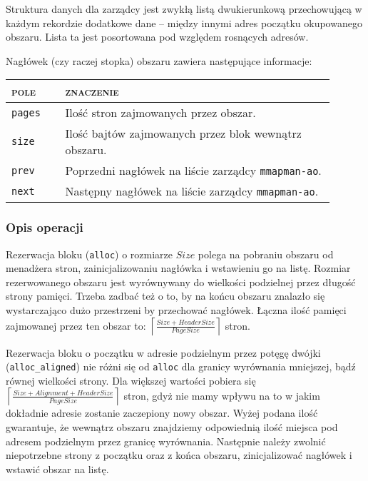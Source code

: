 \documentclass[12pt,a4paper,titlepage,twoside]{mwart}
\begin{document}
Struktura danych dla zarządcy jest zwykłą listą dwukierunkową przechowującą w
każdym rekordzie dodatkowe dane -- między innymi adres początku okupowanego
obszaru. Lista ta jest posortowana pod względem rosnących adresów.

Nagłówek (czy raczej stopka) obszaru zawiera następujące informacje:
\begin{center}
\begin{tabular}{|m{0.15\linewidth}|p{0.75\linewidth}|}
\hline
\textsc{pole} & \textsc{znaczenie} \\
\hline
\hline
\verb+pages+ & Ilość stron zajmowanych przez obszar. \\
\hline
\verb+size+	 & Ilość bajtów zajmowanych przez blok wewnątrz obszaru. \\
\hline
\verb+prev+	 & Poprzedni nagłówek na liście zarządcy \texttt{mmapman-ao}. \\
\hline
\verb+next+	 & Następny nagłówek na liście zarządcy \texttt{mmapman-ao}. \\
\hline
\end{tabular}
\end{center}

\subsubsection{Opis operacji}

Rezerwacja bloku (\verb+alloc+) o rozmiarze $Size$ polega na pobraniu obszaru od
menadżera stron, zainicjalizowaniu nagłówka i wstawieniu go na listę. Rozmiar
rezerwowanego obszaru jest wyrównywany do wielkości podzielnej przez długość
strony pamięci. Trzeba zadbać też o to, by na końcu obszaru znalazło się
wystarczająco dużo przestrzeni by przechować nagłówek. Łączna ilość pamięci
zajmowanej przez ten obszar to:
$\left\lceil\frac{Size + HeaderSize}{PageSize}\right\rceil$ stron.

Rezerwacja bloku o początku w adresie podzielnym przez potęgę dwójki
(\verb+alloc_aligned+) nie różni się od \verb+alloc+ dla granicy wyrównania
mniejszej, bądź równej wielkości strony. Dla większej wartości pobiera się 
$\left\lceil\frac{Size + Alignment + HeaderSize}{PageSize}\right\rceil$
stron, gdyż nie mamy wpływu na to w jakim dokładnie adresie zostanie zaczepiony
nowy obszar. Wyżej podana ilość gwarantuje, że wewnątrz obszaru znajdziemy
odpowiednią ilość miejsca pod adresem podzielnym przez granicę wyrównania.
Następnie należy zwolnić niepotrzebne strony z początku oraz z końca obszaru,
zinicjalizować nagłówek i wstawić obszar na listę.
\end{document}
